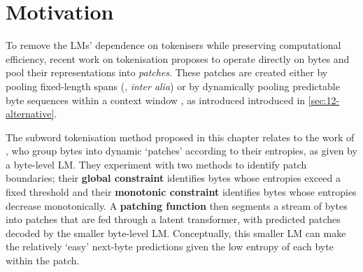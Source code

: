 
\section{Motivation}\label{sec:16-motivation}

To remove the LMs' dependence on tokenisers while preserving computational efficiency, recent work on tokenisation proposes to operate directly on bytes and pool their representations into \textit{patches}. These patches are created either by pooling fixed-length spans (\citealp{dai-etal-2020-funnel, nawrot-etal-2022-hierarchical, yu2023megabyte}, \textit{inter alia}) or by dynamically pooling predictable byte sequences within a context window \citep{nawrot-etal-2023-efficient, pagnoni2024byte}, as introduced introduced in \cref{sec:12-alternative}.

The subword tokenisation method proposed in this chapter relates to the work of \citet{pagnoni2024byte}, who group bytes into dynamic `patches' according to their entropies, as given by a byte-level LM. They experiment with two methods to identify patch boundaries; their \textbf{global constraint} identifies bytes whose entropies exceed a fixed threshold and their \textbf{monotonic constraint} identifies bytes whose entropies decrease monotonically. A \textbf{patching function} then segments a stream of bytes into patches that are fed through a latent transformer, with predicted patches decoded by the smaller byte-level LM. Conceptually, this smaller LM can make the relatively `easy' next-byte predictions given the low entropy of each byte within the patch.

